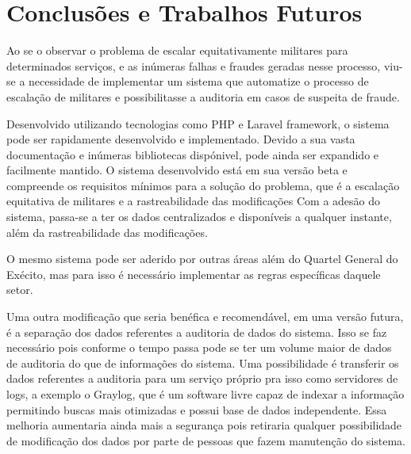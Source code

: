 \chapter{Conclusões e Trabalhos Futuros}

Ao se o observar o problema de escalar equitativamente militares para determinados serviços, e as inúmeras falhas e fraudes geradas nesse processo, viu-se a necessidade de implementar um sistema que automatize o processo de escalação de militares e possibilitasse a auditoria em casos de suspeita de fraude. 

Desenvolvido utilizando tecnologias como PHP e Laravel framework, o sistema pode ser rapidamente desenvolvido e implementado. Devido a sua vasta documentação e inúmeras bibliotecas dispónivel, pode ainda ser expandido e facilmente mantido. O sistema desenvolvido está em sua versão beta e compreende os requisitos mínimos para a solução do problema, que é a escalação equitativa de militares e a rastreabilidade das modificações 
Com a adesão do sistema, passa-se a ter os dados centralizados e disponíveis a qualquer instante, além da rastreabilidade das modificações.

O mesmo  sistema pode ser aderido por outras áreas além do Quartel General do Exécito, mas para isso é necessário implementar as regras específicas daquele setor.

Uma outra modificação que seria benéfica e recomendável, em uma versão futura, é a separação dos dados referentes a auditoria de dados do sistema. Isso se faz necessário pois conforme o tempo passa pode se ter um volume maior de dados de auditoria do que de informações do sistema. Uma possibilidade é transferir os dados referentes a auditoria para um serviço próprio pra isso como servidores de logs, a exemplo o Graylog, que é um software livre capaz de indexar a informação permitindo buscas mais otimizadas e possui base de dados independente. Essa melhoria aumentaria ainda mais a segurança pois retiraria qualquer possibilidade de modificação dos dados por parte de pessoas que fazem manutenção do sistema.


